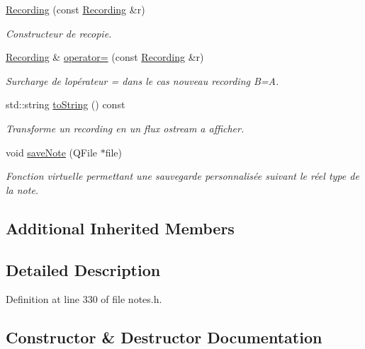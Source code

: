 \begin{DoxyCompactItemize}
\hyperlink{class_recording_ab354d60b8ecb06699378a849f6143ac6}{Recording} (const \hyperlink{class_recording}{Recording} \&r)
\begin{DoxyCompactList}\small\item\em Constructeur de recopie. \end{DoxyCompactList}\item 
\hyperlink{class_recording}{Recording} \& \hyperlink{class_recording_ac5c7522d695c8a657f5e801df97a9e06}{operator=} (const \hyperlink{class_recording}{Recording} \&r)
\begin{DoxyCompactList}\small\item\em Surcharge de l\textquotesingle{}opérateur = dans le cas nouveau recording B=A. \end{DoxyCompactList}\item 
std\+::string \hyperlink{class_recording_a9f403a39bec2db40c9171a6c3a20942d}{to\+String} () const
\begin{DoxyCompactList}\small\item\em Transforme un recording en un flux ostream a afficher. \end{DoxyCompactList}\item 
void \hyperlink{class_recording_a99e10c8a8c13bce5f70195b6c30a1cc9}{save\+Note} (Q\+File $\ast$file)
\begin{DoxyCompactList}\small\item\em Fonction virtuelle permettant une sauvegarde personnalisée suivant le réel type de la note. \end{DoxyCompactList}\end{DoxyCompactItemize}
\subsection*{Additional Inherited Members}


\subsection{Detailed Description}


Definition at line 330 of file notes.\+h.



\subsection{Constructor \& Destructor Documentation}
\mbox{\label{class_recording_a2e3359660cd7573807fb46c15daf4e78}} 
